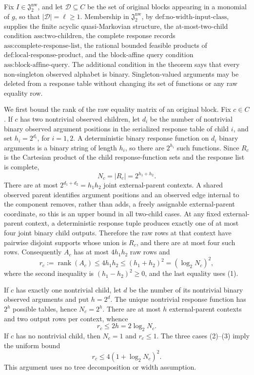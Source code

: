 Fix \(I\in\mathfrak J_2^{\mathrm{nw}}\), and let \(\mathcal D\subseteq C\) be the set of original blocks appearing in a monomial of \(g\), so that \(|\mathcal D|=\ell\ge 1\).  Membership in \(\mathfrak J_2^{\mathrm{nw}}\), by \(\text{def:no-width-input-class}\), supplies the finite acyclic quasi-Markovian structure, the at-most-two-child condition \(\text{ass:two-children}\), the complete response records \(\text{ass:complete-response-list}\), the rational bounded feasible products of \(\text{def:local-response-product}\), and the block-affine query condition \(\text{ass:block-affine-query}\).  The additional condition in the theorem says that every non-singleton observed alphabet is binary.  Singleton-valued arguments may be deleted from a response table without changing its set of functions or any raw equality row.

We first bound the rank of the raw equality matrix of an original block.  Fix \(c\in C\).  If \(c\) has two nontrivial observed children, let \(d_i\) be the number of nontrivial binary observed argument positions in the serialized response table of child \(i\), and set \(h_i=2^{d_i}\), for \(i=1,2\).  A deterministic binary response function on \(d_i\) binary arguments is a binary string of length \(h_i\), so there are \(2^{h_i}\) such functions.  Since \(R_c\) is the Cartesian product of the child response-function sets and the response list is complete,
\[
 N_c=|R_c|=2^{h_1+h_2}.
 \tag{1}
\]
There are at most \(2^{d_1+d_2}=h_1h_2\) joint external-parent contexts.  A shared observed parent identifies argument positions and an observed edge internal to the component removes, rather than adds, a freely assignable external-parent coordinate, so this is an upper bound in all two-child cases.  At any fixed external-parent context, a deterministic response tuple produces exactly one of at most four joint binary child outputs.  Therefore the raw rows at that context have pairwise disjoint supports whose union is \(R_c\), and there are at most four such rows.  Consequently \(A_c\) has at most \(4h_1h_2\) raw rows and
\[
 r_c:=\operatorname{rank}(A_c)
 \le 4h_1h_2
 \le (h_1+h_2)^2
 = (\log_2 N_c)^2,
 \tag{2}
\]
where the second inequality is \((h_1-h_2)^2\ge0\), and the last equality uses (1).

If \(c\) has exactly one nontrivial child, let \(d\) be the number of its nontrivial binary observed arguments and put \(h=2^d\).  The unique nontrivial response function has \(2^h\) possible tables, hence \(N_c=2^h\).  There are at most \(h\) external-parent contexts and two output rows per context, whence
\[
 r_c\le 2h=2\log_2 N_c.
 \tag{3}
\]
If \(c\) has no nontrivial child, then \(N_c=1\) and \(r_c\le1\).  The three cases (2)--(3) imply the uniform bound
\[
 r_c\le4(1+\log_2N_c)^2.
 \tag{4}
\]
This argument uses no tree decomposition or width assumption.

